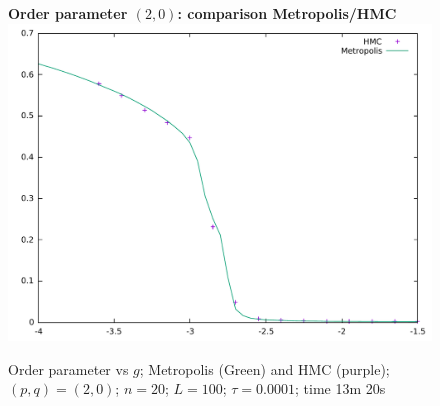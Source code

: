 \documentclass[12pt,a4paper]{article}
\begin{document}
\begin{figure}[!htb]
\centering
\textbf{Order parameter $(2,0)$: comparison Metropolis/HMC}
\includegraphics[width=1\linewidth]{p2q0n20F.pdf}
\caption{Order parameter vs $g$; Metropolis (Green) and HMC (purple); $(p,q)=(2,0)$; $n=20$; $L=100$; $\tau = 0.0001$; time 13m 20s}
\end{figure}
\end{document}
